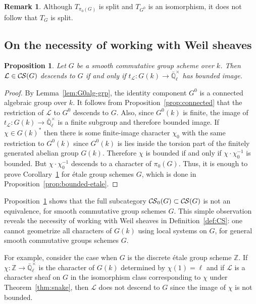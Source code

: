 \documentclass[10pt]{amsart}
\theoremstyle{plain}
\newtheorem{proposition}[theorem]{Proposition}
\theoremstyle{definition}
\newtheorem{remark}[theorem]{Remark}
\newcommand{\ZZ}{{\mathbb{Z}}}
\newcommand{\EE}{\mathbb{\bar Q}_\ell}
\newcommand{\Fq}{k}
\newcommand{\EEx}{\EE^\times}
\newcommand{\trFrob}[1]{t_{#1}}
\newcommand{\TrFrob}[1]{T_{#1}}
\newcommand{\cs}[1]{{\mathcal{#1}}}
\newcommand{\CS}{{\mathcal{C\hskip-0.8pt S}}}
\newcommand{\bCS}{{\CS_0}}
\begin{document}
\begin{remark}
Although $\TrFrob{\pi_0(G)}$ is split and $\TrFrob{G^0}$ is an isomorphism, it does not follow that $\TrFrob{G}$ is split. 
\end{remark}


\subsection{On the necessity of working with Weil sheaves}

\begin{proposition} \label{prop:bounded}
Let $G$ be a smooth commutative group scheme over $\Fq$. 
Then $\cs{L}\in \CS(G)$ descends to $G$ if and only if $\trFrob{\cs{L}} : G(\Fq) \to \EEx$ has bounded image.
\end{proposition}
\begin{proof} 
By Lemma~\ref{lem:G0alg-grp}, the identity component $G^0$ is a connected algebraic group over $\Fq$. 
It follows from Proposition~\ref{prop:connected} that the restriction of $\cs{L}$ to $G^0$ descends to $G$. 
Also, since $G^0(\Fq)$ is finite, the image of $\trFrob{\cs{L}} : G(\Fq) \to \EEx$ is a finite subgroup and therefore bounded image.  
%
If $\chi \in G(\Fq)^*$ then there is some finite-image character $\chi_0$
with the same restriction to $G^0(\Fq)$ since $G^0(\Fq)$ is lies inside the torsion part of
the finitely generated abelian group $G(\Fq)$.  Therefore $\chi$ is bounded 
if and only if $\chi \cdot \chi_0^{-1}$ is bounded.  But $\chi \cdot \chi_0^{-1}$ descends
to a character of $\pi_0(G)$.
Thus, it is enough to prove Corollary~\ref{prop:bounded}
for \'etale group schemes $G$, which is done in Proposition~\ref{prop:bounded-etale}.
\end{proof}

Proposition~\ref{prop:bounded} shows that the full subcategory
$\bCS(G) \subset \CS(G)$ is not an equivalence, for smooth commutative group schemes $G$.
This simple observation reveals the necessity of working with Weil sheaves in Definition~\ref{def:CS}: one cannot geometrize all characters of $G(\Fq)$ using local systems on $G$, for general smooth commutative groups schemes $G$. 

For example, consider the case when $G$ is the discrete \'etale group scheme $\ZZ$.
If $\chi : \ZZ \to \EEx$ is the character of $G(\Fq)$ determined by $\chi(1) = \ell$
and if $\cs{L}$ is a character sheaf on $G$ in the isomorphism class
corresponding to $\chi$ under Theorem~\ref{thm:snake},
then $\cs{L}$ does not descend to $G$ since the image of $\chi$ is not
bounded.
\end{document}

